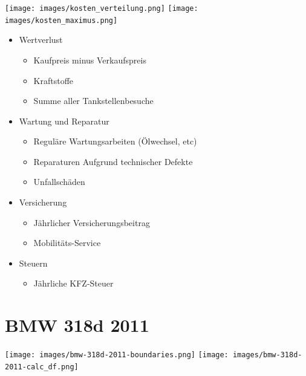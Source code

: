 \documentclass[landscape, DIV=99, 14pt]{scrartcl}
\begin{document}
\twocolumn
\texttt{[image: images/kosten\_verteilung.png]}
\texttt{[image: images/kosten\_maximus.png]}

\pagebreak

\begin{itemize}
    \item Wertverlust
    \begin{itemize}
        \item Kaufpreis minus Verkaufspreis
        \item Kraftstoffe
        \item Summe aller Tankstellenbesuche
    \end{itemize}
    \item Wartung und Reparatur
    \begin{itemize}
        \item Regul\"are Wartungsarbeiten (\"Olwechsel, etc)
        \item Reparaturen Aufgrund technischer Defekte
        \item Unfallsch\"aden
    \end{itemize}
    \item Versicherung
    \begin{itemize}
        \item J\"ahrlicher Versicherungsbeitrag
        \item Mobilit\"ats-Service
    \end{itemize}
    \item Steuern
    \begin{itemize}
            \item J\"ahrliche KFZ-Steuer
    \end{itemize}
\end{itemize}


\twocolumn

\section*{BMW 318d 2011}
\begin{center}
\texttt{[image: images/bmw-318d-2011-boundaries.png]}
\null
\vspace{0.5cm}
\texttt{[image: images/bmw-318d-2011-calc\_df.png]}
\end{center}
\end{document}
